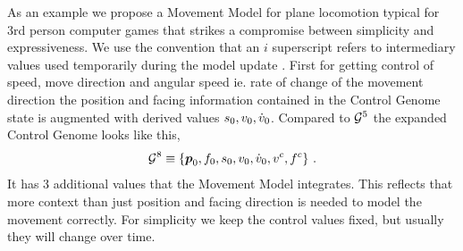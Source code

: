 As an example we propose a Movement Model for plane locomotion typical for 3rd person computer games   that strikes a compromise between simplicity and expressiveness. We use the convention that an $i$ superscript refers to intermediary values used temporarily during the model update . 
%
First for getting control of speed, move direction and angular speed ie. rate of change of the movement direction the position and facing information contained in the Control Genome state is augmented with derived values $s_0, v_0, {\dot{v}}_0$. 
%
Compared to $\mathcal{G}^{5}$ the expanded Control Genome looks like this,
\begin{subequations}
\begin{align}
    \mathcal{G}^{8} \equiv \left\{ \boldsymbol{p }_0,f_0,s_0,v_0,{\dot{v}}_0,v^c,f^c \right\}\,.
\end{align}
\end{subequations}
It has 3 additional values that the Movement Model integrates. This reflects that more context than just position and facing direction is needed to model the movement correctly. For simplicity we keep the control values fixed, but usually they will change over time.

